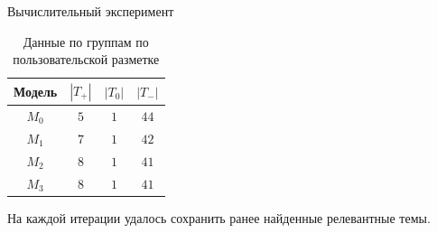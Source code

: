 \documentclass{beamer}
\begin{document}
\begin{frame}{Вычислительный эксперимент}

    \begin{table}[]
        \centering
        \begin{tabular}{c|c|c|c|}
            Модель & $|T_+|$ & $|T_0|$ & $|T_-|$ \\
            \hline
            $M_0$ & $5$ & $1$ & $44$ \\
            $M_1$ & $7$ & $1$ & $42$ \\
            $M_2$ & $8$ & $1$ & $41$ \\
            $M_3$ & $8$ & $1$ & $41$
        \end{tabular}
        \caption{Данные по группам по пользовательской разметке}
        \label{tab:my_label}
    \end{table}

    На каждой итерации удалось сохранить ранее найденные релевантные темы.

\end{frame}
\end{document}
